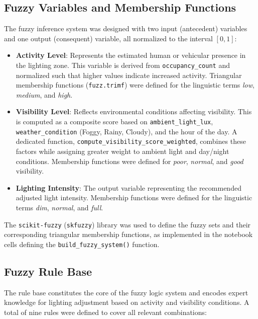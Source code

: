 \documentclass[conference]{IEEEtran}
\begin{document}
\subsection{Fuzzy Variables and Membership Functions}
The fuzzy inference system was designed with two input (antecedent) variables and one output (consequent) variable, all normalized to the interval $[0,1]$:

\begin{itemize}
    \item \textbf{Activity Level}: Represents the estimated human or vehicular presence in the lighting zone. This variable is derived from \texttt{occupancy\_count} and normalized such that higher values indicate increased activity. Triangular membership functions (\texttt{fuzz.trimf}) were defined for the linguistic terms \emph{low}, \emph{medium}, and \emph{high}.
    
    \item \textbf{Visibility Level}: Reflects environmental conditions affecting visibility. This is computed as a composite score based on \texttt{ambient\_light\_lux}, \texttt{weather\_condition} (Foggy, Rainy, Cloudy), and the hour of the day. A dedicated function, \texttt{compute\_visibility\_score\_weighted}, combines these factors while assigning greater weight to ambient light and day/night conditions. Membership functions were defined for \emph{poor}, \emph{normal}, and \emph{good} visibility.
    
    \item \textbf{Lighting Intensity}: The output variable representing the recommended adjusted light intensity. Membership functions were defined for the linguistic terms \emph{dim}, \emph{normal}, and \emph{full}.
\end{itemize}

The \texttt{scikit-fuzzy} (\texttt{skfuzzy}) library was used to define the fuzzy sets and their corresponding triangular membership functions, as implemented in the notebook cells defining the \texttt{build\_fuzzy\_system()} function.

\subsection{Fuzzy Rule Base}
The rule base constitutes the core of the fuzzy logic system and encodes expert knowledge for lighting adjustment based on activity and visibility conditions. A total of nine rules were defined to cover all relevant combinations:
\end{document}
